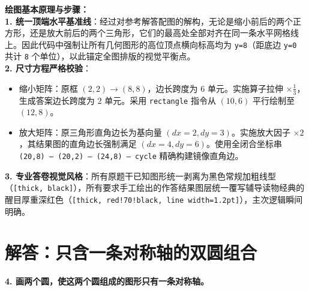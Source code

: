 \vspace{0.6cm}

{\small\color{blue!70!black}
\textbf{绘图基本原理与步骤：}\\
\textbf{1. 统一顶端水平基准线}：经过对参考解答配图的解构，无论是缩小前后的两个正方形，还是放大前后的两个三角形，它们的最高处全部对齐在同一条水平网格线上。因此代码中强制让所有几何图形的高位顶点横向标高均为 \texttt{y=8}（距底边 \texttt{y=0} 共计 \texttt{8} 个单位），以此锚定全图排版的视觉平衡点。\\
\textbf{2. 尺寸方程严格校验}：
   \begin{itemize}
       \item 缩小矩阵：原框 $(2,2) \to (8,8)$，边长跨度为 $6$ 单元。实施算子拉伸 $\times \frac{1}{3}$，生成答案边长跨度为 $2$ 单元。采用 \texttt{rectangle} 指令从 $(10,6)$ 平行绘制至 $(12,8)$。
       \item 放大矩阵：原三角形直角边长为基向量 $(dx=2, dy=3)$。实施放大因子 $\times 2$，其结果图的直角边长强制满足 $(dx=4, dy=6)$。使用全闭合坐标串 \texttt{(20,8) -- (20,2) -- (24,8) -- cycle} 精确构建镜像直角边。
   \end{itemize}
\textbf{3. 专业答卷视觉风格}：所有原题干已知图形统一剥离为黑色常规加粗线型（\texttt{[thick, black]}），所有要求手工绘出的作答结果图层统一覆写辅导读物经典的醒目厚重深红色（\texttt{[thick, red!70!black, line width=1.2pt]}），主次逻辑瞬间明确。
}

\vspace{0.8cm}
\vspace{0.8cm}



\section{解答：只含一条对称轴的双圆组合}

\vspace{0.4cm}

\noindent\textbf{4. 画两个圆，使这两个圆组成的图形只有一条对称轴。}

\vspace{1.2cm}

